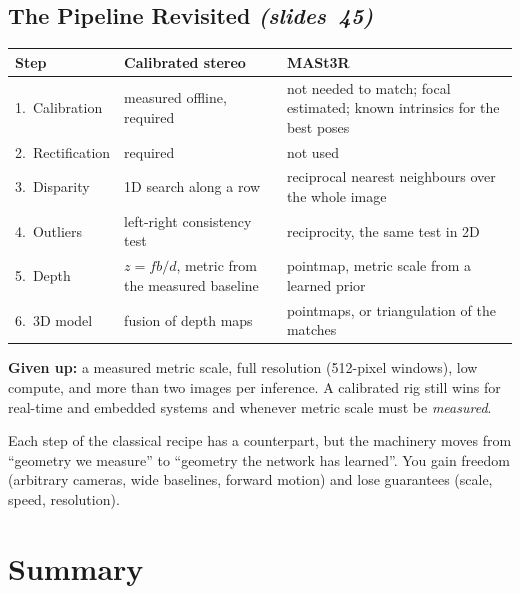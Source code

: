 \documentclass[11pt,a4paper]{article}
\newcommand{\slr}[1]{\texorpdfstring{\emph{(slides~#1)}}{(slides #1)}}
\theoremstyle{definition}
\begin{document}
\subsection{The Pipeline Revisited \slr{45}}
\begin{center}\small
\renewcommand{\arraystretch}{1.2}
\begin{tabular}{@{}p{2.3cm}p{5.2cm}p{6.6cm}@{}}\toprule
\textbf{Step} & \textbf{Calibrated stereo} & \textbf{MASt3R}\\\midrule
1.\ Calibration & measured offline, required & not needed to match; focal estimated; known intrinsics for the best poses\\
2.\ Rectification & required & not used\\
3.\ Disparity & 1D search along a row & reciprocal nearest neighbours over the whole image\\
4.\ Outliers & left-right consistency test & reciprocity, the same test in 2D\\
5.\ Depth & $z=fb/d$, metric from the measured baseline & pointmap, metric scale from a learned prior\\
6.\ 3D model & fusion of depth maps & pointmaps, or triangulation of the matches\\\bottomrule
\end{tabular}
\end{center}
\textbf{Given up:} a measured metric scale, full resolution (512-pixel windows), low compute, and more than two images per inference.
A calibrated rig still wins for real-time and embedded systems and whenever metric scale must be \emph{measured}.
\begin{intuition}
Each step of the classical recipe has a counterpart, but the machinery moves from ``geometry we measure'' to ``geometry the network has learned''. You gain freedom (arbitrary cameras, wide baselines, forward motion) and lose guarantees (scale, speed, resolution).
\end{intuition}


\section*{Summary}
\end{document}
